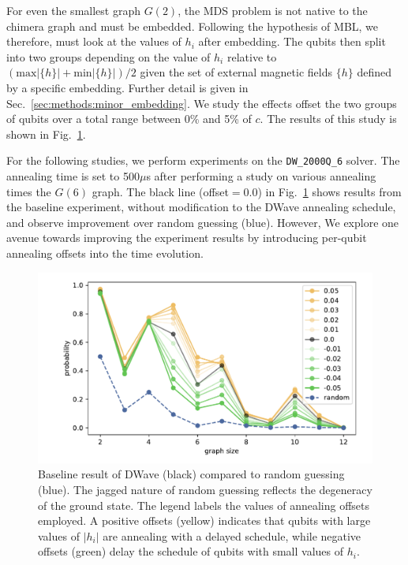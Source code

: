 \documentclass[prd,twocolumn,tightenlines,preprintnumbers,showpacs,superscriptaddress,notitlepage,nofootinbib,eqsecnum,floatfix,longbibliography,aps,10pt]{revtex4-2}
\begin{document}
For even the smallest graph $G(2)$, the MDS problem is not native to the chimera graph and must be embedded. Following the hypothesis of MBL, we therefore, must look at the values of $h_i$ after embedding. The qubits then split into two groups depending on the value of $h_i$ relative to $(\textrm{max}|\{h\}| + \textrm{min}|\{h\}|) / 2$ given the set of external magnetic fields $\{h\}$ defined by a specific embedding. Further detail is given in Sec.~\ref{sec:methods:minor_embedding}. We study the effects offset the two groups of qubits over a total range between 0\% and 5\% of $c$. The results of this study is shown in Fig.~\ref{fig:baseline}.

For the following studies, we perform experiments on the \texttt{DW\_2000Q\_6} solver. The annealing time is set to 500$\mu$s after performing a study on various annealing times the $G(6)$ graph. The black line (offset$=0.0$) in Fig.~\ref{fig:baseline} shows results from the baseline experiment, without modification to the DWave annealing schedule, and observe improvement over random guessing (blue). However, We explore one avenue towards improving the experiment results by introducing per-qubit annealing offsets into the time evolution.

\begin{figure}
	\centering
	\includegraphics[width=\columnwidth]{./new_figures/DWave_scaling.pdf}
	\caption{Baseline result of DWave (black) compared to random guessing (blue). The jagged nature of random guessing reflects the degeneracy of the ground state. The legend labels the values of annealing offsets employed. A positive offsets (yellow) indicates that qubits with large values of $|h_i|$ are annealing with a delayed schedule, while negative offsets (green) delay the schedule of qubits with small values of $h_i$.}
	\label{fig:baseline}
\end{figure}
\end{document}
